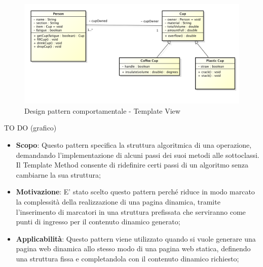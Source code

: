 		
		\begin{figure}[htbp]
			\centering
			\centerline{\includegraphics[scale=0.3]{./images/example_graph.png}}
			\caption{Design pattern comportamentale - Template View}
		\end{figure}
		TO DO (grafico)
		
		
		\begin{itemize}
			\item \textbf{Scopo}: Questo pattern specifica la struttura algoritmica di una operazione, demandando l'implementazione di alcuni passi dei suoi metodi alle sottoclassi. Il Template Method consente di ridefinire certi passi di un algoritmo senza cambiarne la sua struttura;
			
			\item \textbf{Motivazione}: E' stato scelto questo pattern perché riduce in modo marcato la complessità della realizzazione di una pagina dinamica, tramite l'inserimento di marcatori in una struttura prefissata che serviranno come punti di ingresso per il contenuto dinamico generato;
			
			\item \textbf{Applicabilità}: Questo pattern viene utilizzato quando si vuole generare una pagina web dinamica allo stesso modo di una pagina web statica, definendo una struttura fissa e completandola con il contenuto dinamico richiesto;
			
		\end{itemize}




